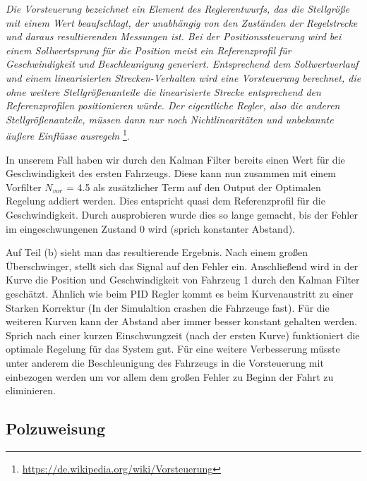 \textit{Die Vorsteuerung bezeichnet ein Element des Reglerentwurfs, das die
    Stellgröße mit einem Wert beaufschlagt, der unabhängig von den Zuständen der
    Regelstrecke und daraus resultierenden Messungen ist. Bei der
    Positionssteuerung wird bei einem Sollwertsprung für die Position meist ein
    Referenzprofil für Geschwindigkeit und Beschleunigung generiert.
    Entsprechend dem Sollwertverlauf und einem linearisierten Strecken-Verhalten
    wird eine Vorsteuerung berechnet, die ohne weitere Stellgrößenanteile die
    linearisierte Strecke entsprechend den Referenzprofilen positionieren würde.
Der eigentliche Regler, also die anderen Stellgrößenanteile, müssen dann nur
noch Nichtlinearitäten und unbekannte äußere Einflüsse ausregeln}
\footnote{\url{https://de.wikipedia.org/wiki/Vorsteuerung}}.

In unserem Fall haben wir durch den Kalman Filter bereits einen Wert für die
Geschwindigkeit des ersten Fahrzeugs. Diese kann nun zusammen mit einem
Vorfilter $N_{vor}$ = 4.5 als zusätzlicher Term auf den Output der Optimalen
Regelung addiert werden. Dies entspricht quasi dem Referenzprofil für die
Geschwindigkeit. Durch ausprobieren wurde dies so lange gemacht, bis der Fehler
im eingeschwungenen Zustand 0 wird (sprich konstanter Abstand).

Auf Teil (b) sieht man das resultierende Ergebnis. Nach einem großen
Überschwinger, stellt sich das Signal auf den Fehler ein. Anschließend wird in
der Kurve die Position und Geschwindigkeit von Fahrzeug 1 durch den Kalman
Filter geschätzt. Ähnlich wie beim PID Regler kommt es beim Kurvenaustritt zu
einer Starken Korrektur (In der Simulaltion crashen die Fahrzeuge fast). Für die
weiteren Kurven kann der Abstand aber immer besser konstant gehalten werden.
Sprich nach einer kurzen Einschwungzeit (nach der ersten Kurve) funktioniert die
optimale Regelung für das System gut. Für eine weitere Verbesserung müsste unter
anderem die Beschleunigung des Fahrzeugs in die Vorsteuerung mit einbezogen
werden um vor allem dem großen Fehler zu Beginn der Fahrt zu eliminieren.

\subsection{Polzuweisung}\label{subsec:polzuweisung}
